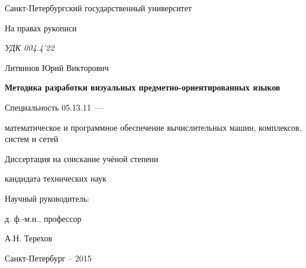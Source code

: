 \thispagestyle{empty}

\begin{center}
Санкт-Петербургский государственный университет\par
\par 
\par
\end{center}

\vspace{20mm}
\begin{flushright}
На правах рукописи

{\sl УДК 004.4'22}
\end{flushright}

\vspace{25mm}
\begin{center}
{\large Литвинов Юрий Викторович}
\end{center}

\vspace{5mm}
\begin{center}
{\bf \large Методика разработки визуальных предметно-ориентированных языков
\par}

\vspace{10mm}
{%
Специальность 05.13.11~---

математическое и программное обеспечение вычислительных машин, комплексов, систем и сетей
}

\vspace{10mm}
Диссертация на соискание учёной степени

кандидата технических наук
\end{center}

\vspace{20mm}
\begin{flushright}
Научный руководитель:

д. ф.-м.н., профессор

А.Н. Терехов

\end{flushright}

\vspace{20mm}
\begin{center}
{Санкт-Петербург -- 2015}
\end{center}

\newpage